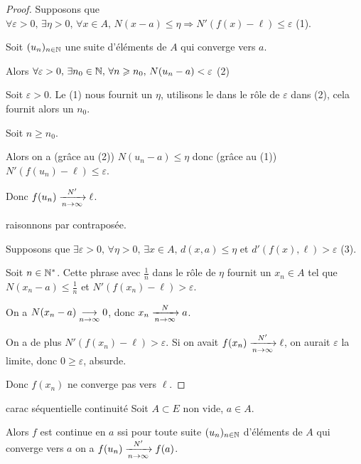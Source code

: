 
\begin{proof}
    Supposons que $\forall \varepsilon > 0, \, \exists \eta > 0, \, \forall x \in A, \, N(x - a) \leqslant \eta \Rightarrow N'(f(x) - \ell) \leqslant \varepsilon$ (1).

    Soit $(u_n)_{n \in \N}$ une suite d'éléments de $A$ qui converge vers $a$.

    Alors $\forall \varepsilon > 0, \, \exists n_0 \in \N, \, \forall n \geqslant n_0, \, N(u_n - a) < \varepsilon$ (2)

    Soit $\varepsilon > 0$. Le (1) nous fournit un $\eta$, utilisons le dans le rôle de $\varepsilon$ dans (2),
    cela fournit alors un $n_0$.

    Soit $n \geqslant n_0$. 

    Alors on a (grâce au (2)) $N(u_n - a) \leqslant \eta$ donc (grâce au (1)) $N'(f(u_n) - \ell) \leqslant \varepsilon$.

    Donc $f(u_n) \limitnorme{N'}{n}{\infty} \ell$.

     raisonnons par contraposée. 

    \svspace Supposons que $\exists \varepsilon > 0, \, \forall \eta > 0, \, \exists x \in A, \, d(x, a) \leqslant \eta $ et $d'(f(x), \ell) > \varepsilon$ (3).

    Soit $n \in \N^*$. Cette phrase avec $\frac 1 n$ dans le rôle de $\eta$ fournit
    un $x_n \in A$ tel que $N(x_n - a) \leqslant \frac 1 n$ et $N'(f(x_n) - \ell) > \varepsilon$.

    On a $N(x_n - a) \limit n \infty 0$, donc $x_n \limitnorme N n \infty a$.

    On a de plus $N'(f(x_n) - \ell) > \varepsilon$. Si on avait $f(x_n) \limitnorme{N'}{n}{\infty} \ell$, 
    on aurait $\varepsilon$ la limite, donc $0 \geqslant \varepsilon$, absurde.

    Donc $f(x_n)$ ne converge pas vers $\ell$.
\end{proof}


\begin{theoreme}{carac séquentielle continuité}{}
    Soit $A \subset E$ non vide, $a \in A$. 

    Alors $f$ est continue en $a$ ssi pour toute suite $(u_n)_{n \in \N}$ d'éléments de $A$ 
    qui converge vers $a$ on a $f(u_n) \limitnorme{N'}{n}{\infty} f(a)$.
\end{theoreme}

